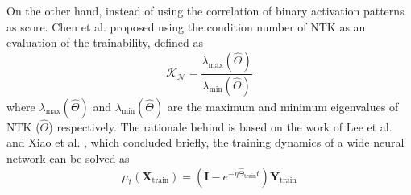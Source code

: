 \documentclass[sigconf]{acmart}
\begin{document}
    On the other hand, instead of using the correlation of binary activation 
    patterns as score. Chen et al. proposed using the condition number of NTK 
    as an evaluation of the trainability, defined as
    \begin{equation}
        \mathcal{K_N}=\frac{\lambda_{\textrm{max}}(\hat\Theta)}{\lambda_{\textrm{min}}(\hat\Theta)}
    \end{equation}
    where $\lambda_{\textrm{max}}(\hat\Theta)$ and $\lambda_{\textrm{min}}(\hat\Theta)$ 
    are the maximum and minimum eigenvalues of NTK ($\hat\Theta$) respectively.
    The rationale behind is based on the work of Lee et al. \cite{Lee_2020} and 
    Xiao et al. \cite{DBLP:journals/corr/abs-1912-13053}, which concluded briefly, 
    the training dynamics of a wide neural network can be solved as 
    \begin{equation}
        \mu_t(\textbf{X}_{\textrm{train}})=(\textbf{I}-e^{-\eta\hat\Theta_{\textrm{train}}t})\textbf{Y}_{\textrm{train}}
    \end{equation}


    
    
\end{document}

